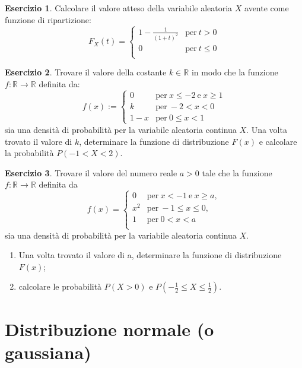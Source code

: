 \documentclass[12pt,a4paper]{article}
\theoremstyle{definition}
\newtheorem{exe}{Esercizio}
\newcommand{\numberset}{\mathbb}
\newcommand{\R}{\numberset{R}}
\begin{document}
\begin{exe}
	Calcolare il valore atteso della variabile aleatoria $ X $ avente come funzione di ripartizione:
	\[ F_{X}(t) = \begin{cases}
			1- \frac{1}{(1+t)^2} & \text{per} \ t>0   \\
			0                    & \text{per} \ t\le0 \\
		\end{cases} \]
\end{exe}

\begin{exe}
	Trovare il valore della costante $ k \in \R $ in modo che la funzione $ f : \R \to \R $ definita da:
	\[ f(x) := \begin{cases}
			0   & \mbox{per}\ x \le -2 \ \mbox{e}\ x \ge 1 \\
			k   & \mbox{per}\ -2<x<0                       \\
			1-x & \mbox{per}\ 0 \le x <1
		\end{cases} \]
	sia una densità di probabilità per la variabile aleatoria continua $ X $. Una volta trovato il valore di $ k $, determinare la funzione di distribuzione $ F(x) $ e calcolare la probabilità $ P(-1<X<2) $.
\end{exe}

\begin{exe}
	Trovare il valore del numero reale $ a > 0 $ tale che la funzione $ f : \R \to \R $ definita da
	\[ f(x) = \begin{cases}
			0   & \mbox{per} \ x < -1 \ \mbox{e} \ x \ge a, \\
			x^2 & \mbox{per} \ -1\le x \le 0,               \\
			1   & \mbox{per} \ 0 < x < a                    \\
		\end{cases} \]
	sia una densità di probabilità per la variabile aleatoria continua $ X $.
	\begin{enumerate}
		\item Una volta trovato il valore di a, determinare la funzione di distribuzione $ F(x) $;
		\item calcolare le probabilità $ P(X > 0)$ e $ P \left(-\frac{1}{2} \le X \le \frac{1}{2} \right)  $.
	\end{enumerate}
\end{exe}

\section{Distribuzione normale (o gaussiana)}
\end{document}
